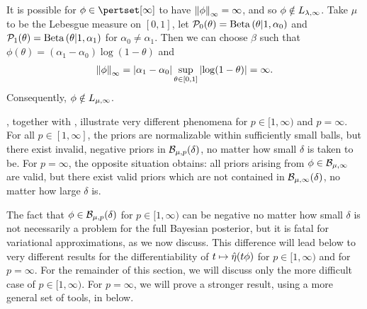 \begin{ex}
%
It is possible for $\phi \in \pertset[\infty]$ to have $\left\Vert\phi\right\Vert_{\infty} =
\infty$, and so $\phi \notin {L_{\lambda,\infty}}$.  Take $\mu$ to be the
Lebesgue measure on $[0,1]$, let $\mathcal{P}_{0}(\theta) = \mathrm{Beta}\left(\theta \vert 1,
\alpha_0\right)$ and $\mathcal{P}_{1}(\theta) = \mathrm{Beta}\left(\theta \vert 1, \alpha_1\right)$ for
$\alpha_0 \ne \alpha_1$.  Then we can choose $\beta$ such that $\phi(\theta) =
(\alpha_1 - \alpha_0) \log(1 - \theta)$
%
and
%
\begin{align*}
%
\norminf{\phi} =
    \abs{\alpha_1 - \alpha_0} \sup_{\theta \in [0,1]} \abs{\log(1 - \theta)} =
    \infty.
%
\end{align*}
%
Consequently, $\phi \notin {L_{\mu,\infty}}$.
%
\end{ex}

, together with ,
illustrate very different phenomena for $p \in [1, \infty)$ and $p = \infty$.
For all $p \in [1, \infty]$, the priors are normalizable within sufficiently
small balls, but there exist invalid, negative priors in
$\mathcal{B}_{\mu,p}(\delta)$, no matter how small $\delta$ is taken to be.   For
$p=\infty$, the opposite situation obtains: all priors arising from $\phi \in
\mathcal{B}_{\mu,\infty}$ are valid, but there exist valid priors which are not
contained in $\mathcal{B}_{\mu,\infty}(\delta)$, no matter how large $\delta$ is.

The fact that $\phi \in \mathcal{B}_{\mu,p}(\delta)$ for $p \in [1, \infty)$ can be
negative no matter how small $\delta$ is not necessarily a problem for the full
Bayesian posterior, but it is fatal for variational approximations, as we now
discuss.  This difference will lead below to very different results for the
differentiability of $t \mapsto \hat\eta(t \phi)$ for $p \in [1, \infty)$ and
for $p = \infty$.
%
For the remainder of this section, we will discuss only the more difficult case
of $p \in [1, \infty)$.  For $p=\infty$, we will prove a stronger result, using
a more general set of tools, in  below.

